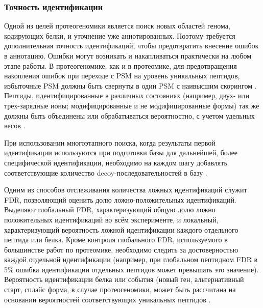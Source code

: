\subsubsection{Точность идентификации}
Одной из целей протеогеномики является поиск новых областей генома, кодирующих белки, и уточнение уже аннотированных. Поэтому требуется дополнительная точность идентификаций, чтобы предотвратить внесение ошибок в аннотацию. Ошибки могут возникать и накапливаться практически на любом этапе работы. В протеогеномике, как и в протеомике, для предотвращения накопления ошибок при переходе с PSM на уровень уникальных пептидов, избыточные PSM должны быть свернуты в один PSM с наивысшим скорингом \cite{nesvizhskii2010survey}. Пептиды, идентифицированные в различных состояниях (например, двух- или трех-зарядные ионы; модифицированные и не модифицированные формы) так же должны быть объединены или обрабатываться вероятностно, с учетом удельных весов \cite{shteynberg2011iprophet}. 

При использовании многоэтапного поиска, когда результаты первой идентификации используются при подготовки базы для дальнейшей, более специфической идентификации, необходимо на каждом шагу добавлять соответствующие количество decoy-последовательностей в базу \cite{nesvizhskii2010survey}. 

Одним из способов отслеживания количества ложных идентификаций служит FDR, позволяющий оценить долю ложно-положительных идентификаций. Выделяют глобальный FDR, характеризующий общую долю ложно положительных идентификаций во всём эксперименте, и локальный, характеризующий вероятность ложной идентификации каждого отдельного пептида или белка. Кроме контроля глобального FDR, используемого в большинстве работ по протеомике, необходимо следить за достоверностью каждой отдельной идентификации (например, при глобальном пептидном FDR в 5\% ошибка идентификации отдельных пептидов может превышать это значение). Вероятность идентификации белка или события (новый ген, альтернативный старт, сплайс форма, в случае протеогеномики, может быть рассчитана на основании вероятностей соответствующих уникальных пептидов \cite{shteynberg2011iprophet, castellana2010proteogenomics}.



